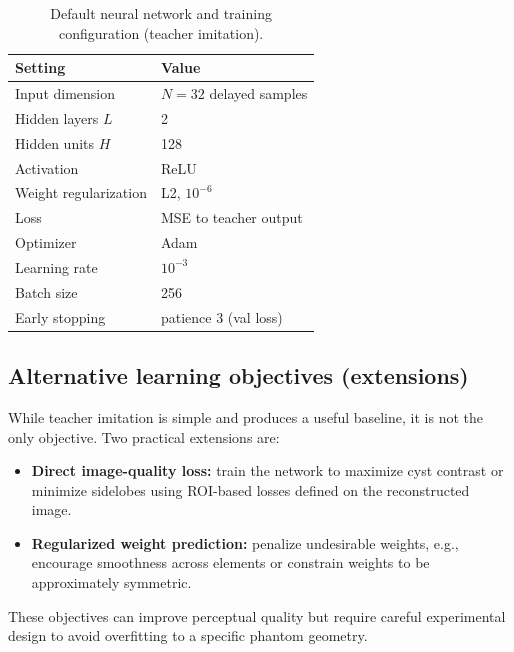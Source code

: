 \documentclass[conference]{IEEEtran}
\begin{document}
\begin{table}[t]
\centering
\caption{Default neural network and training configuration (teacher imitation).}
\label{tab:nn_hparams}
\begin{tabular}{ll}
\toprule
Setting & Value \\
\midrule
Input dimension & $N=32$ delayed samples \\
Hidden layers $L$ & 2 \\
Hidden units $H$ & 128 \\
Activation & ReLU \\
Weight regularization & L2, $10^{-6}$ \\
Loss & MSE to teacher output \\
Optimizer & Adam \\
Learning rate & $10^{-3}$ \\
Batch size & 256 \\
Early stopping & patience 3 (val loss) \\
\bottomrule
\end{tabular}
\end{table}

\subsection{Alternative learning objectives (extensions)}
While teacher imitation is simple and produces a useful baseline, it is not the only objective.
Two practical extensions are:
\begin{itemize}
    \item \textbf{Direct image-quality loss:} train the network to maximize cyst contrast or minimize sidelobes using ROI-based losses defined on the reconstructed image.
    \item \textbf{Regularized weight prediction:} penalize undesirable weights, e.g., encourage smoothness across elements or constrain weights to be approximately symmetric.
\end{itemize}
These objectives can improve perceptual quality but require careful experimental design to avoid overfitting to a specific phantom geometry.
\end{document}
